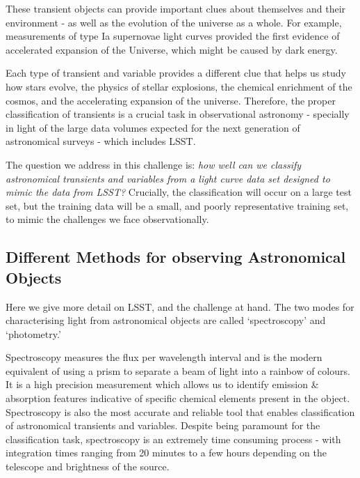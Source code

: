 These transient objects can provide important clues about themselves and their environment - as well as the evolution of the universe as a whole. For example, measurements of type Ia supernovae light curves provided the first evidence of accelerated expansion of the Universe, which might be caused by dark energy.

Each type of transient and variable provides a different clue that helps us study how stars evolve, the physics of stellar explosions, the chemical enrichment of the cosmos, and the accelerating expansion of the universe.  Therefore, the proper classification of transients is a crucial task in observational astronomy - specially in light of the large data volumes expected for the next generation of astronomical surveys - which includes LSST.

The question we address in this challenge is: \textit{how well can we classify astronomical transients and variables from a  light curve data set designed to mimic the data from LSST?} Crucially, the classification will occur on a large test set, but the training data will be a small, and poorly representative training set, to mimic the challenges we face observationally.

\subsection{Different Methods for observing Astronomical Objects}
\label{subsec:observmethods}
Here we give more detail on LSST, and the challenge at hand. The two modes for characterising light from astronomical objects are called `spectroscopy' and `photometry.'

Spectroscopy measures the flux per wavelength interval and is the modern equivalent of using a prism to separate a beam of light into a rainbow of colours. It is a high precision measurement which allows us to identify emission \& absorption features indicative of specific chemical elements present in the object.  Spectroscopy is also the most accurate and reliable tool that enables classification of astronomical transients and variables. Despite being paramount for the classification task, spectroscopy is an extremely time consuming process - with integration times ranging from 20 minutes to a few hours depending on the telescope and brightness of the source.

